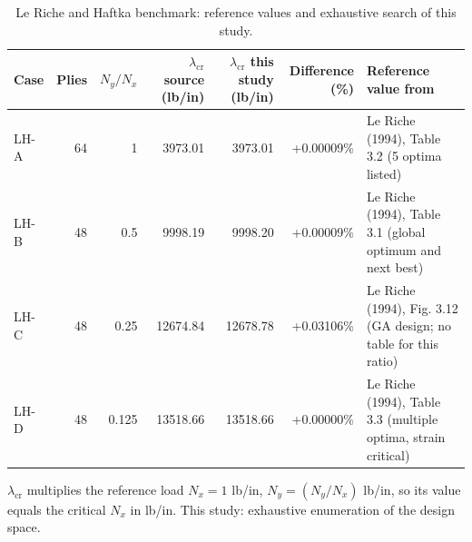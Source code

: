 \begin{table}[htbp]
\centering
\caption{Le Riche and Haftka benchmark: reference values and exhaustive search of this study.}
\label{tab:leriche_haftka}
\begin{tabular}{lrrrrrl}
\toprule
Case & Plies & $N_y/N_x$ & $\lambda_{\mathrm{cr}}$ source (lb/in) & $\lambda_{\mathrm{cr}}$ this study (lb/in) & Difference (\%) & Reference value from \\
\midrule
LH-A & 64 & 1 & 3973.01 & 3973.01 & +0.00009\% & Le Riche (1994), Table 3.2 (5 optima listed) \\
LH-B & 48 & 0.5 & 9998.19 & 9998.20 & +0.00009\% & Le Riche (1994), Table 3.1 (global optimum and next best) \\
LH-C & 48 & 0.25 & 12674.84 & 12678.78 & +0.03106\% & Le Riche (1994), Fig. 3.12 (GA design; no table for this ratio) \\
LH-D & 48 & 0.125 & 13518.66 & 13518.66 & +0.00000\% & Le Riche (1994), Table 3.3 (multiple optima, strain critical) \\
\bottomrule
\end{tabular}
\par\smallskip
{\footnotesize $\lambda_{\mathrm{cr}}$ multiplies the reference load $N_x = 1$ lb/in, $N_y = (N_y/N_x)$ lb/in, so its value equals the critical $N_x$ in lb/in. This study: exhaustive enumeration of the design space.}
\end{table}
